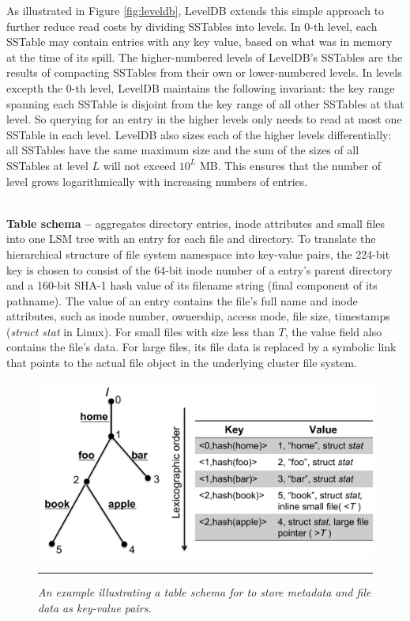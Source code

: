 As illustrated in Figure \ref{fig:leveldb},
LevelDB extends this simple approach to further
reduce read costs by dividing SSTables into levels.
In 0-th level, each SSTable may contain entries with any key value,
based on what was in memory at the time of its spill.
The higher-numbered levels of LevelDB's SSTables are
the results of compacting SSTables from their own or lower-numbered levels.
In levels excepth the 0-th level, LevelDB maintains the following invariant:
the key range spanning each SSTable is disjoint from
the key range of all other SSTables at that level.
So querying for an entry in the higher levels
only needs to read at most one SSTable in each level.
LevelDB also sizes each of the higher levels differentially:
all SSTables have the same maximum size and
the sum of the sizes of all SSTables at level $L$ will not exceed $10^L$ MB.
This ensures that the number of level grows
logarithmically with increasing numbers of entries.

~\\
\textbf{Table schema -- }
\tfs aggregates directory entries,
inode attributes and small files into one LSM tree
with an entry for each file and directory.
To translate the hierarchical structure of file system namespace
into key-value pairs, the 224-bit key is chosen to consist of
the 64-bit inode number of a entry's parent directory
and a 160-bit SHA-1 hash value of its filename string
(final component of its pathname).
The value of an entry contains the file's full name and inode attributes,
such as inode number, ownership, access mode, file size, timestamps (\textit{struct stat} in Linux).
For small files with size less than $T$, the value field also contains the file's data.
For large files, its file data is replaced by a symbolic link
that points to the actual file object in the underlying cluster file system.

\begin{figure}[t]
\centering
\includegraphics[scale=0.4]{figs/schema}
\vspace{10pt}
\caption{\textit{
An example illustrating a table schema for \tfs
to store metadata and file data as key-value pairs.}}
\vspace{10pt}
\hrule
\label{fig:schema}
\end{figure}

